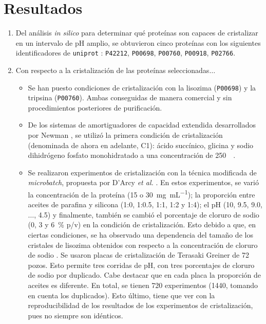\chapter{Resultados}
	\begin{enumerate}
		\item Del análisis \emph{in silico} para determinar qué proteínas son capaces de cristalizar en un intervalo de pH amplio, se obtuvieron cinco proteínas con los siguientes identificadores de \verb|uniprot| \cite{Bateman2021}: \verb|P42212|, \verb|P00698|, \verb|P00760|, \verb|P00918|, \verb|P02766|. 
		\item  Con respecto a la cristalización de las proteínas seleccionadas$\ldots$ 
		\begin{itemize}
		\item Se han puesto condiciones de cristalización con la lisozima (\verb|P00698|) y la tripsina (\verb|P00760|). Ambas conseguidas de manera comercial y sin procedimientos posteriores de purificación. 
		
		\item De los sistemas de amortiguadores de capacidad extendida desarrollados por Newman \cite{Newman2004}, se utilizó la primera condición de cristalización (denominada de ahora en adelante, C1): ácido succínico, glicina y sodio dihidrógeno fosfato monohidratado a una concentración de \SI{250}{\milli\Molar}. 
		
		\item Se realizaron experimentos de cristalización con la técnica modificada de \emph{microbatch}, propuesta por D'Arcy \emph{et al.} \cite{DArcy1996}. En estos experimentos, se varió la concentración de la proteína (15 o \SI{30}{\milli\gram\per\milli\liter}); la proporción entre aceites de parafina y silicona (1:0, 1:0.5, 1:1, 1:2 y 1:4); el pH (10, 9.5, 9.0, $\ldots$, 4.5) y finalmente, también se cambió el porcentaje de cloruro de sodio (0, 3 y \SI{6}{\percent} p/v) en la condición de cristalización. Esto debido a que, en ciertas condiciones, se ha observado una dependencia del tamaño de los cristales de lisozima obtenidos con respecto a la concentración de cloruro de sodio \cite{Svanidze2005}. Se usaron placas de cristalización de Terasaki Greiner de \num{72} pozos. Esto permite tres corridas de pH, con tres porcentajes de cloruro de sodio por duplicado. Cabe destacar que en cada placa la proporción de aceites es diferente. En total, se tienen \num{720} experimentos (\num{1440}, tomando en cuenta los duplicados). Esto último, tiene que ver con la reproducibilidad de los resultados de los experimentos de cristalización, pues no siempre son idénticos.
		

\end{itemize}
\end{enumerate}
